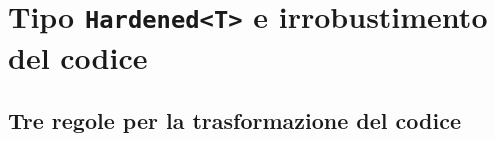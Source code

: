 \section{Tipo \texttt{Hardened<T>} e irrobustimento del codice}

\subsection{Tre regole per la trasformazione del codice}
